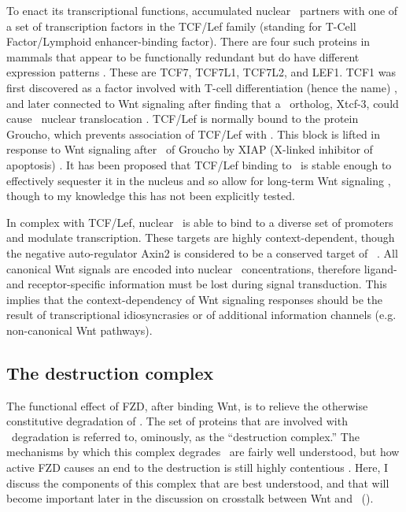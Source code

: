 To enact its transcriptional functions, accumulated nuclear
\bcat\ partners with one of a set of transcription
factors in the TCF/Lef family (standing for T-Cell Factor/Lymphoid 
enhancer-binding factor). There are four such proteins in mammals
that appear to be functionally redundant but do have different expression
patterns \cite{Clevers2006}. These are TCF7, TCF7L1, TCF7L2, and LEF1.
TCF1 was first discovered as a factor involved
with T-cell differentiation (hence the name) \cite{VandeWetering1991}, and later
connected to Wnt signaling after finding that a \frog\ ortholog, Xtcf-3,
could cause \bcat\ nuclear translocation \cite{MOLENAAR1996}.
TCF/Lef is normally bound to the protein Groucho, which prevents association of TCF/Lef
with \bcat. This block is lifted in response to Wnt signaling after \ubn\
of Groucho by XIAP (X-linked inhibitor of apoptosis) \cite{Hanson2012}.
It has been proposed that TCF/Lef binding to \bcat\ is stable enough to
effectively sequester it in the nucleus
and so allow for long-term Wnt signaling \cite{Jamieson2012},
though to my knowledge this has not been explicitly tested.


In complex with TCF/Lef, nuclear \bcat\ is able to bind to a diverse set of
promoters and modulate transcription. These targets are highly context-dependent,
though the negative auto-regulator Axin2 is considered to be a conserved
target of \bcat\ \cite{Clevers2006,Hatzis2008}. All canonical Wnt signals
are encoded into nuclear \bcat\ concentrations, therefore ligand-
and receptor-specific information must be lost during signal transduction.
This implies that the context-dependency of Wnt signaling responses should
be the result of transcriptional idiosyncrasies or of additional information
channels (e.g. non-canonical Wnt pathways).


\subsection{The destruction complex}
\label{pathways:wnt:destruction}


The functional effect of FZD, after binding Wnt,
is to relieve the otherwise constitutive degradation of \bcat. 
The set of proteins that are involved
with \bcat\ degradation is referred to, ominously,
as the ``destruction complex.'' The mechanisms by which this
complex degrades \bcat\ are fairly well understood, but how
active FZD causes an end to the destruction is still
highly contentious \cite{Hernandez2012,Li2012}.
Here, I discuss the components of this
complex that are best understood, and that will become important
later in the discussion on crosstalk between Wnt and \tgfbsf\
().


